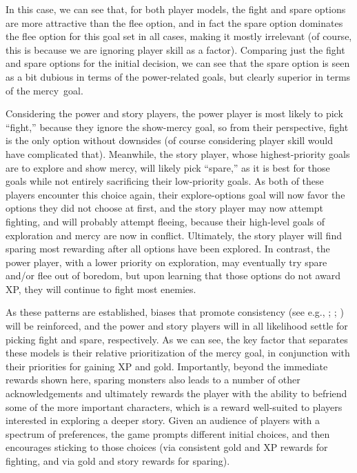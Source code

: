 \documentclass[arts,article,accept,moreauthors,pdftex,10pt,a4paper]{Definitions/mdpi}
\begin{document}
In this case, we can see that, for both player models, the fight and spare options are more attractive than the flee option, and in fact the spare option dominates the flee option for this goal set in all cases, making it mostly irrelevant (of course, this is because we are ignoring player skill as a factor).
%
Comparing just the fight and spare options for the initial decision, we can see that the spare option is seen as a bit dubious in terms of the power-related goals, but clearly superior in terms of the mercy~goal.


Considering the power and story players, the power player is most likely to pick ``fight,'' because they ignore the show-mercy goal, so from their perspective, fight is the only option without downsides (of course considering player skill would have complicated that).
%
Meanwhile, the story player, whose highest-priority goals are to explore and show mercy, will likely pick ``spare,'' as it is best for those goals while not entirely sacrificing their low-priority goals.
%
As both of these players encounter this choice again, their explore-options goal will now favor the options they did not choose at first, and the story player may now attempt fighting, and will probably attempt fleeing, because their high-level goals of exploration and mercy are now in conflict.
%
Ultimately, the story player will find sparing most rewarding after all options have been explored.
%
In contrast, the power player, with a lower priority on exploration, may eventually try spare and/or flee out of boredom, but upon learning that those options do not award XP, they will continue to fight most enemies.


As these patterns are established, biases that promote consistency (see e.g., \citealp{brehm1956postdecision}; \mbox{\citealp{mather2000misremembrance}}; \citealp{hall2012lifting}) will be reinforced, and the power and story players will in all likelihood settle for picking fight and spare, respectively.
%
As we can see, the key factor that separates these models is their relative prioritization of the mercy goal, in conjunction with their priorities for gaining XP and gold.
%
Importantly, beyond the immediate rewards shown here, sparing monsters also leads to a number of other acknowledgements and ultimately rewards the player with the ability to befriend some of the more important characters, which is a reward well-suited to players interested in exploring a deeper story.
%
Given an audience of players with a spectrum of preferences, the game prompts different initial choices, and then encourages sticking to those choices (via consistent gold and XP rewards for fighting, and via gold and story rewards for sparing).
\end{document}
